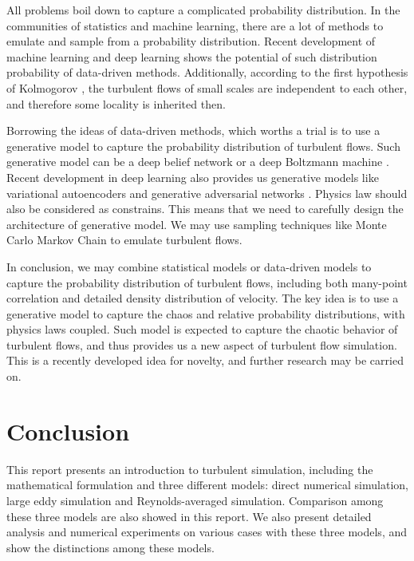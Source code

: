 \documentclass[english, nochinese]{pkupaper}
\begin{document}
All problems boil down to capture a complicated probability distribution. In the communities of statistics and machine learning, there are a lot of methods to emulate and sample from a probability distribution. Recent development of machine learning and deep learning shows the potential of such distribution probability of data-driven methods. Additionally, according to the first hypothesis of Kolmogorov \parencite{kolmogorov_equations_1941}, the turbulent flows of small scales are independent to each other, and therefore some locality is inherited then.

Borrowing the ideas of data-driven methods, which worths a trial is to use a generative model to capture the probability distribution of turbulent flows. Such generative model can be a deep belief network \parencite{hinton_fast_2006} \parencite{lee_convolutional_2009} or a deep Boltzmann machine \parencite{salakhutdinov_restricted_2007} \parencite{nair_rectified_2010} \parencite{salakhutdinov_efficient_2010}. Recent development in deep learning also provides us generative models like variational autoencoders \parencite{kingma_auto-encoding_2013} \parencite{doersch_tutorial_2016} and generative adversarial networks \parencite{goodfellow_nips_2016} \parencite{arjovsky_wasserstein_2017}. Physics law should also be considered as constrains. This means that we need to carefully design the architecture of generative model. We may use sampling techniques like Monte Carlo Markov Chain to emulate turbulent flows.

In conclusion, we may combine statistical models or data-driven models to capture the probability distribution of turbulent flows, including both many-point correlation and detailed density distribution of velocity. The key idea is to use a generative model to capture the chaos and relative probability distributions, with physics laws coupled. Such model is expected to capture the chaotic behavior of turbulent flows, and thus provides us a new aspect of turbulent flow simulation. This is a recently developed idea for novelty, and further research may be carried on.

\section{Conclusion} \label{Sec:Con}

This report presents an introduction to turbulent simulation, including the mathematical formulation and three different models: direct numerical simulation, large eddy simulation and Reynolds-averaged simulation. Comparison among these three models are also showed in this report. We also present detailed analysis and numerical experiments on various cases with these three models, and show the distinctions among these models.
\end{document}
